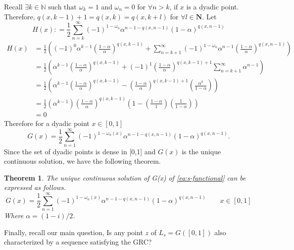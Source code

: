 \documentclass[epsf,10pt]{article}
\newcommand\NN{\mathbf{N}}
\newtheorem{theorem}{Theorem}[section]
\begin{document}
\bigskip
Recall $\exists k\in \mathbb{N} \text { such that } \omega_k=1$ and $\omega_n=0$ for $\forall n> k$, if $x$ is a dyadic point. Therefore, $q(x,k-1)+1 = q(x,k)  =q(x, k+l)$ for $\forall l \in \NN$. Let
    \begin{equation*}
        H(x): = \frac{1}{2} \sum_{n=k}^{\infty}(-1)^{1-\omega_n}\alpha^{n-1-q(x,n-1)}(1-\alpha)^{q(x,n-1)}
    \end{equation*} 
    \begin{align*}
       H(x)
         &=\frac{1}{2}\left((-1)^0 \alpha^{k-1}\left(\frac{1-\alpha}{\alpha}\right)^{q(x,k-1)}+\sum_{n=k+1}^{\infty}(-1)^{1-\omega_n}\alpha^{n-1}\left(\frac{1-\alpha}{\alpha}\right)^{q(x,n-1)}\right)\\
         &=\frac{1}{2}\left( \alpha^{k-1}\left(\frac{1-\alpha}{\alpha}\right)^{q(x,k-1)}+(-1)^{1}\left(\frac{1-\alpha}{\alpha}\right)^{q(x,k-1)+1}\sum_{n=k+1}^{\infty}\alpha^{n-1}\right)\\
         &=\frac{1}{2}\left( \alpha^{k-1}\left(\frac{1-\alpha}{\alpha}\right)^{q(x,k-1)}-\left(\frac{1-\alpha}{\alpha}\right)^{q(x,k-1)+1} \left( \frac{\alpha^k}{1-\alpha}\right)\right)\\
         &=\frac{1}{2}\left(\alpha^{k-1}\right) \left(\frac{1-\alpha}{\alpha}\right)^{q(x,k-1)}\left(1-\left(\frac{1-\alpha}{1}\right)\left(\frac{1}{1-\alpha}\right)\right)\\
         &=0
    \end{align*}
Therefore for a dyadic point $x\in[0,1]$
\begin{equation*}
    G(x) = \frac{1}{2}\sum_{n=1}^{\infty}(-1)^{1-\omega_n(x)}\alpha^{n-1-q(x,n-1)}(1-\alpha)^{q(x,n-1)}.
\end{equation*}
Since the set of dyadic points is dense in [0,1] and $G(x)$ is the unique continuous solution, we have the following theorem.
\begin{theorem}
    \label{Main-Result}
    The unique continuous solution of G(x) of \eqref{eq:s-functional} can be expressed as follows.
    \begin{equation}
    G(x) = \frac{1}{2} \sum^\infty_{n=1} (-1)^{1-\omega_n(x)} \alpha^{n-1-q(x,n-1)}(1-\alpha)^{q(x,n-1)} \qquad x \in [0,1] 
    \end{equation}
    Where $\alpha = (1-i)/2$.
\end{theorem}
\bigskip

Finally, recall our main question, Is any point $z$ of $L_s=G([0,1])$  also characterized by a sequence satisfying the GRC?
\end{document}
